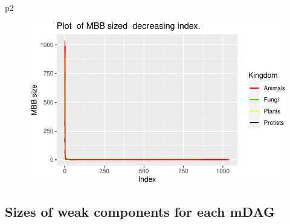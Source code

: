 \documentclass[
  letterpaper,
  DIV=11,
  numbers=noendperiod]{scrreprt}
\newenvironment{Shaded}{}{}
\newcommand{\NormalTok}[1]{\textcolor[rgb]{0.67,0.70,0.75}{#1}}
\begin{document}
\begin{Shaded}
\begin{Highlighting}[]
\NormalTok{p2}
\end{Highlighting}
\end{Shaded}

\begin{figure}[H]

{\centering \includegraphics[width=1\textwidth,height=\textheight]{index_files/figure-pdf/unnamed-chunk-50-3.pdf}

}

\end{figure}

\hypertarget{sizes-of-weak-components-for-each-mdag}{%
\subsection{Sizes of weak components for each
mDAG}\label{sizes-of-weak-components-for-each-mdag}}
\end{document}
